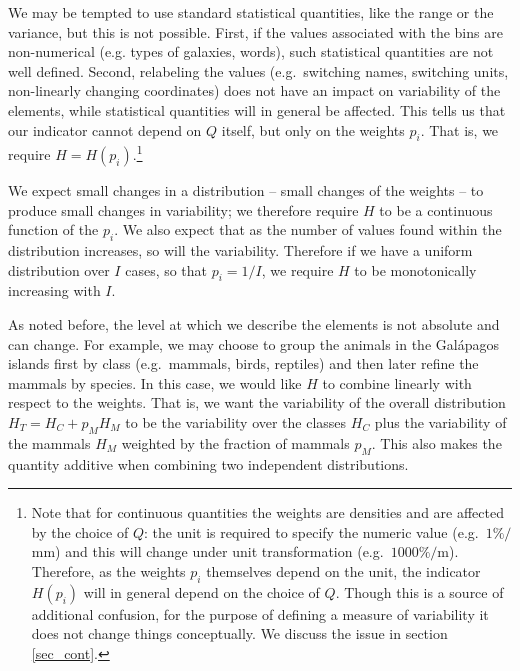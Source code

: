 \documentclass[iopart]{revtex4-1}
\begin{document}
We may be tempted to use standard statistical quantities, like the range or the variance, but this is not possible. First, if the values associated with the bins are non-numerical (e.g. types of galaxies, words), such statistical quantities are not well defined. Second, relabeling the values (e.g.~switching names, switching units, non-linearly changing coordinates) does not have an impact on variability of the elements, while statistical quantities will in general be affected. This tells us that our indicator cannot depend on $Q$ itself, but only on the weights $p_i$. That is, we require $H=H(p_i)$.\footnote{Note that for continuous quantities the weights are densities and are affected by the choice of $Q$: the unit is required to specify the numeric value (e.g.~$1 \% / $mm) and this will change under unit transformation (e.g.~$1000 \% /$m). Therefore, as the weights $p_i$ themselves depend on the unit, the indicator $H(p_i)$ will in general depend on the choice of $Q$. Though this is a source of additional confusion, for the purpose of defining a measure of variability it does not change things conceptually. We discuss the issue in section \ref{sec_cont}.}

We  expect small changes in a distribution -- small changes of the weights -- to produce small changes in variability; we therefore require $H$ to be a continuous function of the $p_i$. We also expect that as the number of values found within the distribution increases, so will the variability. Therefore if we have a uniform distribution over $I$ cases, so that $p_i = 1/I$, we require $H$ to be monotonically increasing with $I$.

As noted before, the level at which we describe the elements is not absolute and can change. For example, we may choose to group the animals in the Gal\'{a}pagos islands first by class (e.g.~mammals, birds, reptiles) and then later refine the mammals by species. In this case, we would like $H$ to combine linearly with respect to the weights. That is, we want the variability of the overall distribution $H_T = H_C + p_M H_M$ to be the variability over the classes $H_C$ plus the variability of the mammals $H_M$ weighted by the fraction of mammals $p_M$. This also makes the quantity additive when combining two independent distributions.
\end{document}
